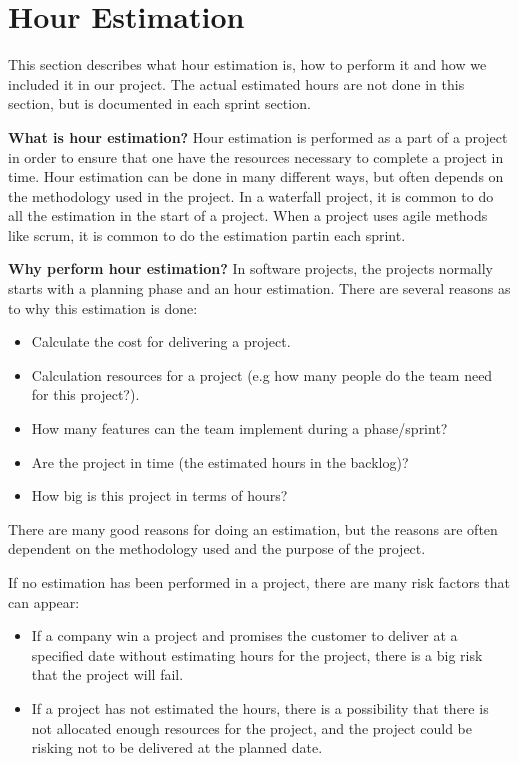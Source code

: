 \section{Hour Estimation}

	This section describes what hour estimation is, how to perform it and how we
	included it in our project. The actual estimated hours are not done in this section, 
	but is documented in each sprint section.

	{\bf What is hour estimation?} Hour estimation is performed as a part of a project in order to ensure that 
	one have the resources necessary to complete a project in time. Hour estimation can be done in many different 
	ways, but often depends on the methodology	used in the project. In a waterfall project, it is common to do all 
	the estimation in the start of a project. When a project uses agile methods like scrum, it is common to do 
	the estimation partin each sprint. \cite{estimation}

	{\bf Why perform hour estimation?} In software projects, the projects normally starts with
	a planning phase and an hour estimation. There are several reasons as to why this estimation is done:
		\begin{itemize}
			\item Calculate the cost for delivering a project.
			\item Calculation resources for a project (e.g how many people do the team 
			need for this project?).
			\item How many features can the team implement during a phase/sprint?
			\item Are the project in time (the estimated hours in the backlog)?
			\item How big is this project in terms of hours?
		\end{itemize}
	There are many good reasons for doing an estimation, but the reasons are often dependent
	on the methodology used and the purpose of the project. 

	If no estimation has been performed in a project, there are many risk factors that can appear:
	\begin{itemize}
		\item If a company win a project and promises the customer to deliver at a 
		specified date without estimating hours for the project, there is a big risk 
		that the project will fail.
		\item If a project has not estimated the hours, there is a possibility that 
		there is not allocated enough resources for the project, and the project could 
		be risking not to be delivered at the planned date.  
	\end{itemize}

